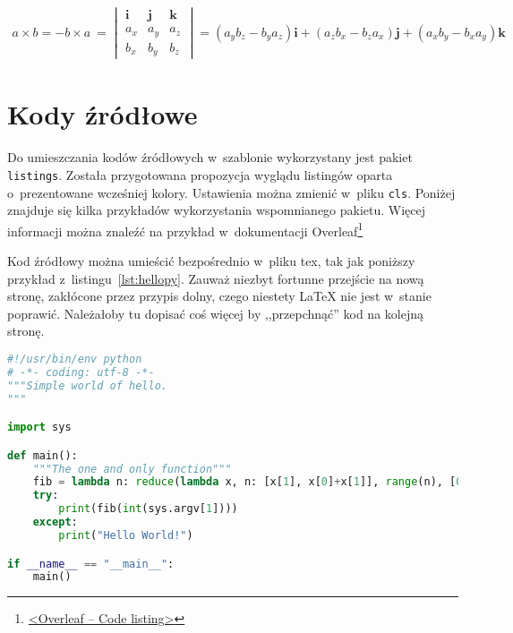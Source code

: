 \begin{gather}
a \times b = -b \times a~= 
\begin{vmatrix}
\pmb{i}    &     \pmb{j}      &      \pmb{k}    \\
a_x        &     a_y          &      a_z        \\
b_x        &     b_y          &      b_z        
\end{vmatrix}
= \left(a_y b_z - b_y a_z \right)\pmb{i} 
+ \left(a_z b_x - b_z a_x \right)\pmb{j} 
+ \left(a_x b_y - b_x a_y \right)\pmb{k} 
\end{gather}


\section{Kody źródłowe}
Do umieszczania kodów źródłowych w~szablonie wykorzystany jest pakiet \texttt{listings}. Została przygotowana propozycja wyglądu listingów oparta o~prezentowane wcześniej kolory. Ustawienia można zmienić w~pliku \texttt{cls}. Poniżej znajduje się kilka przykładów wykorzystania wspomnianego pakietu. Więcej informacji można znaleźć na przykład w~dokumentacji Overleaf\footnote{\href{https://www.overleaf.com/learn/latex/code_listing}{<Overleaf -- Code listing>}}

Kod źródłowy można umieścić bezpośrednio w~pliku tex, tak jak poniższy przykład z~listingu~\ref{lst:hellopy}. Zauważ niezbyt fortunne przejście na nową stronę, zakłócone przez przypis dolny, czego niestety \LaTeX{} nie jest w~stanie poprawić. Należałoby tu dopisać coś więcej by ,,przepchnąć'' kod na kolejną stronę.

\begin{lstlisting}[language=Python,
    caption={Prosty program w~języku Python},
    label={lst:hellopy}]
#!/usr/bin/env python
# -*- coding: utf-8 -*-
"""Simple world of hello.
"""

import sys

def main():
    """The one and only function"""
    fib = lambda n: reduce(lambda x, n: [x[1], x[0]+x[1]], range(n), [0, 1])[0]
    try:
        print(fib(int(sys.argv[1])))
    except:
        print("Hello World!")

if __name__ == "__main__":
    main()
\end{lstlisting}


